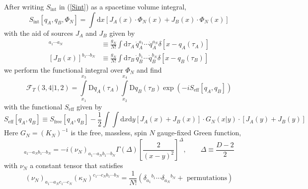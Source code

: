 After writing $S_{\text{int}}$ in (\ref{Sint}) as a spacetime volume integral,
\begin{equation}
	S_{\text{int}}[ q_{A}, q_{B}, \Phi_{N} ] = \int \mathrm{d}x \left[ J_{A}(x) \cdot \Phi_{N}(x) + J_{B}(x) \cdot \Phi_{N}(x) \right]
\end{equation}
with the aid of sources $J_{A}$ and $J_{B}$ given by
\begin{align}
	[J_{A}(x)]^{a_{1} \cdots a_{N}} &\equiv \frac{g_{N}}{N!} \int \mathrm{d} \tau_{A} \, \dot{q}_{A}^{a_{1}} \cdots \dot{q}_{A}^{a_{N}} \delta[x - q_{A}(\tau_{A})]\\
	[J_{B}(x)]^{b_{1} \cdots b_{N}} &\equiv \frac{g_{N}}{N!} \int \mathrm{d} \tau_{B} \, \dot{q}_{B}^{b_{1}} \cdots \dot{q}_{B}^{b_{N}} \delta[x - q_{B}(\tau_{B})]
\end{align}
we perform the functional integral over $\Phi_{N}$ and find
\begin{equation}
	\mathcal{F}_{T}(3, 4|1, 2) = \int\limits_{x_{1}}^{x_{3}} \mathrm{D}q_{A}(\tau_{A}) \int\limits_{x_{2}}^{x_{4}} \mathrm{D}q_{B}(\tau_{B}) \exp{\left( - i S_{\text{eff}}\left[ q_{A}, q_{B}\right] \right)} \label{FSeff}
\end{equation}
with the functional $S_{\text{eff}}$ given by
\begin{equation}
	S_{\text{eff}}\left[ q_{A}, q_{B}\right] \equiv S_{\text{free}}\left[ q_{A}, q_{B}\right] - \frac{1}{2} \int \int \mathrm{d}x \mathrm{d}y \left[ J_{A}(x) + J_{B}(x) \right] \cdot G_{N}(x|y) \cdot \left[ J_{A}(y) + J_{B}(y) \right] \label{Seff}
\end{equation}
Here $G_{N} = (K_{N})^{-1}$ is the free, massless, spin $N$ gauge-fixed Green function,
\begin{equation}
	[G_{N}(x|y)]_{a_{1} \cdots a_{N} b_{1} \cdots b_{N}} = -i (\nu_{N})_{a_{1} \cdots a_{N} b_{1} \cdots b_{N}} \Gamma\left( \Delta \right) \left[ \frac{2}{(x - y)^{2}} \right]^{\Delta}, \qquad \Delta \equiv \frac{D - 2}{2} \label{GN}
\end{equation}
with $\nu_{N}$ a constant tensor that satisfies
\begin{equation}
	(\nu_{N})_{a_{1} \cdots a_{N} c_{1} \cdots c_{N}} (\kappa_{N})^{c_{1} \cdots c_{N} b_{1} \cdots b_{N}} = \frac{1}{N!} \left( \delta_{a_{1}}{}^{b_{1}} \cdots \delta_{a_{N}}{}^{b_{N}} + \text{ permutations} \right)
\end{equation}


